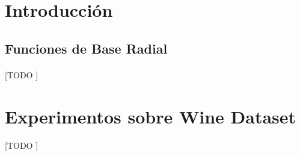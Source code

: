 \documentclass{article}
\begin{document}
	\maketitle %

	\thispagestyle{fancy} %



	\begin{abstract}
		\noindent [TODO ]
	\end{abstract}



	\section{Introducción}
	\label{sec:introducción}

		\subsection{Funciones de Base Radial}
		\label{sec:radial-basis-functions}

			\paragraph{}
			[TODO ]

	\section{Experimentos sobre Wine Dataset}
	\label{sec:e1}

		\paragraph{}
		[TODO ]

	\nocite{subject:taa}
	\nocite{garciparedes:machine-learning-radial-basis-functions}
	\nocite{dataset:wine}
  
  
\end{document}
